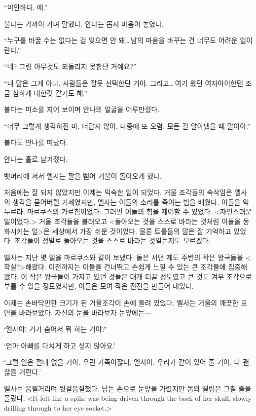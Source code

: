 ``미안하다, 얘.''

불다는 가까이 가며 말했다. 안나는 몹시 마음이 놓였다.

``누구를 바꿀 수는 없다는 걸 잊으면 안 돼\ldots\,남의 마음을 바꾸는 건 너무도 어려운 일이란다.''

``네? 그럼 아무것도 되돌리지 못한단 거예요?''

``내 말은 그게 아냐. 사람들은 잘못 선택한단 거야. 그리고\ldots\,여기 왔던 여자아이한텐 조금 심하게 대한것 같기도 해.''

불다는 미소를 지어 보이며 안나의 얼굴을 어루만졌다.

``너무 그렇게 생각하진 마, 너답지 않아. 나중에 또 오렴, 모든 걸 알아냈을 때 말이야.''

불다도 안나를 떠났다.

안나는 홀로 남겨졌다.

\textbreak

뱃머리에 서서 엘사는 팔을 뻗어 거울이 돌아오게 했다.

처음에는 잘 되지 않았지만 이제는 익숙한 일이 되었다. 거울 조각들의 속삭임은 엘사의 생각을 묻어버릴 기세였지만, 엘사는 이들의 소리를 죽이는 법을 배웠다. 이들을 억누르라, 마르쿠스의 가르침이었다. 그러면 이들의 힘을 제어할 수 있었다. <자연스러운 일이었다.> 거울 조각들을 불러오고 <돌아오는 것을 스스로 바라는 것처럼 이들을 동화시키는 일>은 세상에서 가장 쉬운 것이었다. 물론 트롤들의 말은 잘 기억하고 있었다. 조각들이 정말로 돌아오는 것을 스스로 바라는 것일는지도 모르겠다. %

엘사는 지난 몇 일을 마르쿠스와 같이 보냈다. 둘은 서던 제도 주변의 작은 왕국들을 <학살?\slaughter>해왔다. 이전까지는 이들을 건너뛰고 손쉽게 느낄 수 있는 큰 조각들에 집중해 왔다. 이 작은 왕국들이 가지고 있던 것들은 대개 티끌 정도였고 큰 것도 겨우 조각으로 부를 수 있을 정도였지만, 이들은 모여 작은 진전을 만들어 내었다.

이제는 손바닥만한 크기가 된 거울조각이 손에 들려 있었다. 엘사는 거울의 깨끗한 표면을 바라보았다. 자신의 눈을 바라보자 눈앞에는—

`엘사야! 거기 숨어서 뭐 하는 거야?'

`엄마 아빠를 다치게 하고 싶지 않아요.'

`그럴 일은 절대 없을 거야. 우린 가족이잖니, 엘사야. 우리가 같이 있어 줄 거야. 다 괜찮을 거란다.'

엘사는 움찔거리며 뒷걸음질했다. 남는 손으로 눈앞을 가렸지만 몸의 떨림은 그칠 줄을 몰랐다. <It felt like a spike was being driven through the back of her skull, slowly drilling through to her eye socket.>

